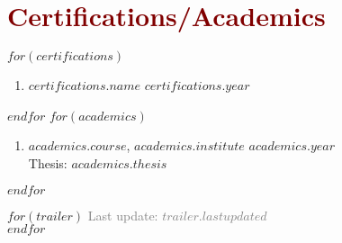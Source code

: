 \documentclass[$fontsize$, a4paper]{article}
\begin{document}
\section*{\textcolor{Maroon}{Certifications/Academics}}
$for(certifications)$
  \begin{enumerate}
    [topsep=0pt,itemsep=0pt,parsep=0pt,partopsep=0pt,leftmargin=10pt,label=•]
    \item{\href{$certifications.url$}{$certifications.name$} \hfill $certifications.year$}
  \end{enumerate}
$endfor$
\vspace*{\fill}
$for(academics)$
  \begin{enumerate}
    [topsep=0pt,itemsep=0pt,parsep=0pt,partopsep=0pt,leftmargin=10pt,label=•]
    \item{{\textbf{$academics.course$}}, \textbf{\href{$academics.url$}{$academics.institute$}} \hfill $academics.year$\\Thesis: \href{$academics.thesis_url$}{$academics.thesis$}}
  \end{enumerate}
$endfor$

\vspace*{\fill}
$for(trailer)$
  \footnotesize{\textcolor{Gray}{Last update: $trailer.lastupdated$}}\\
$endfor$
\end{document}
